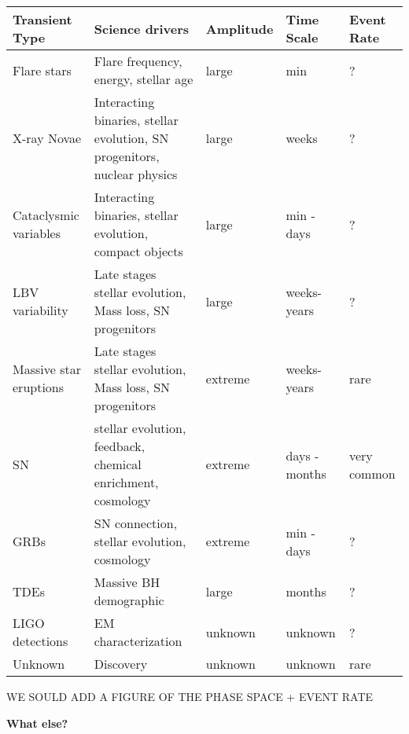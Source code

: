 \begin{center}
  \begin{tabular}{| p{2.5cm} | p{6cm} | l | l | l |}
    \hline

    Transient Type & Science drivers & Amplitude & Time Scale & Event Rate\\
\hline

Flare stars & Flare frequency, energy, stellar age & large & min & ?\\

X-ray Novae & Interacting binaries, stellar evolution, SN progenitors, nuclear physics & large & weeks & ?\\

Cataclysmic variables & Interacting binaries, stellar evolution, compact objects & large & min - days & ?\\

LBV variability & Late stages stellar evolution, Mass loss, SN progenitors & large & weeks-years & ?\\

Massive star eruptions & Late stages stellar evolution, Mass loss, SN progenitors & extreme & weeks-years & rare\\

SN & stellar evolution, feedback, chemical enrichment, cosmology & extreme & days - months & very common\\

GRBs & SN connection, stellar evolution, cosmology & extreme & min - days & ?\\

TDEs & Massive BH demographic & large & months & ?\\

LIGO detections & EM characterization & unknown & unknown & ?\\

Unknown & Discovery & unknown & unknown & rare\\

 \hline \end{tabular}
\end{center}

WE SOULD ADD A FIGURE OF THE PHASE SPACE + EVENT RATE


{\bf What else?}




%




